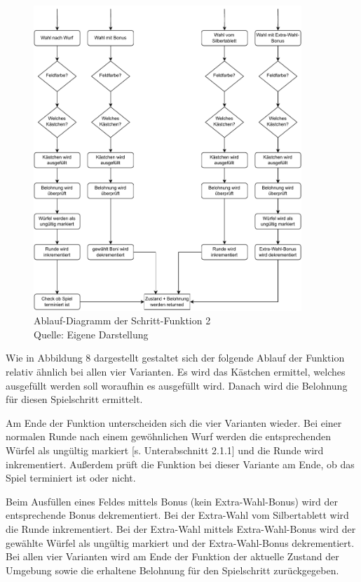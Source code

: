 \begin{figure}[H]
	\centering
	\includegraphics[width=0.9\textwidth]{Bilder/stepf2.drawio (1)} 
	\caption[Ablauf-Diagramm der Schritt-Funktion 2]{Ablauf-Diagramm der Schritt-Funktion 2\\ Quelle: Eigene Darstellung}
\end{figure}

Wie in Abbildung 8 dargestellt gestaltet sich der folgende Ablauf der Funktion relativ ähnlich bei allen vier Varianten. Es wird das Kästchen ermittel, welches ausgefüllt werden soll woraufhin es ausgefüllt wird. Danach wird die Belohnung für diesen Spielschritt ermittelt.

Am Ende der Funktion unterscheiden sich die vier Varianten wieder. Bei einer normalen Runde nach einem gewöhnlichen Wurf werden die entsprechenden Würfel als ungültig markiert [s. Unterabschnitt 2.1.1] und die Runde wird inkrementiert. Außerdem prüft die Funktion bei dieser Variante am Ende, ob das Spiel terminiert ist oder nicht.

Beim Ausfüllen eines Feldes mittels Bonus (kein Extra-Wahl-Bonus) wird der entsprechende Bonus dekrementiert. Bei der Extra-Wahl vom Silbertablett wird die Runde inkrementiert. Bei der Extra-Wahl mittels Extra-Wahl-Bonus wird der gewählte Würfel als ungültig markiert und der Extra-Wahl-Bonus dekrementiert. Bei allen vier Varianten wird am Ende der Funktion der aktuelle Zustand der Umgebung sowie die erhaltene Belohnung für den Spielschritt zurückgegeben.

